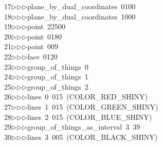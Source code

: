 \begin{tabbing}
17\>$\triangleright$\>$\triangleright$\>$\triangleright$\>plane\_by\_dual\_coordinates\ 0100\ \\[0pt]
18\>$\triangleright$\>$\triangleright$\>$\triangleright$\>plane\_by\_dual\_coordinates\ 1000\ \\[0pt]
19\>$\triangleright$\>$\triangleright$\>$\triangleright$\>point\ 22500\ \\[0pt]
20\>$\triangleright$\>$\triangleright$\>$\triangleright$\>point\ 0180\ \\[0pt]
21\>$\triangleright$\>$\triangleright$\>$\triangleright$\>point\ 009\ \\[0pt]
22\>$\triangleright$\>$\triangleright$\>$\triangleright$\>face\ 0120\ \\[0pt]
23\>$\triangleright$\>$\triangleright$\>$\triangleright$\>group\_of\_things\ 0\ \\[0pt]
24\>$\triangleright$\>$\triangleright$\>$\triangleright$\>group\_of\_things\ 1\ \\[0pt]
25\>$\triangleright$\>$\triangleright$\>$\triangleright$\>group\_of\_things\ 2\ \\[0pt]
26\>$\triangleright$\>$\triangleright$\>$\triangleright$\>lines\ 0\ 015\ (COLOR\_RED\_SHINY)\ \\[0pt]
27\>$\triangleright$\>$\triangleright$\>$\triangleright$\>lines\ 1\ 015\ (COLOR\_GREEN\_SHINY)\ \\[0pt]
28\>$\triangleright$\>$\triangleright$\>$\triangleright$\>lines\ 2\ 015\ (COLOR\_BLUE\_SHINY)\ \\[0pt]
29\>$\triangleright$\>$\triangleright$\>$\triangleright$\>group\_of\_things\_as\_interval\ 3\ 39\ \\[0pt]
30\>$\triangleright$\>$\triangleright$\>$\triangleright$\>lines\ 3\ 005\ (COLOR\_BLACK\_SHINY)\ \\[0pt]

\end{tabbing}
